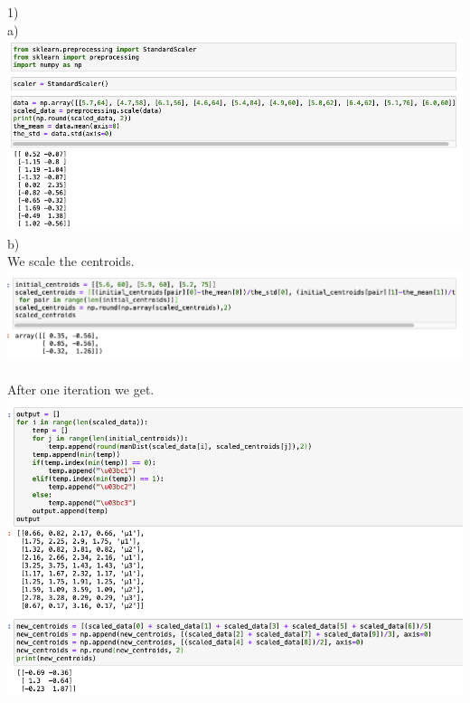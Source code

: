 \documentclass[11pt]{article}
\begin{document}
1) \\
a) \\
\includegraphics[scale=0.4]{img10} \\

b) \\
We scale the centroids. \\
\includegraphics[scale=0.4]{img11} \\
\\
After one iteration we get. \\
\includegraphics[scale=0.4]{img12} \\
\\ \\ 
\end{document}

